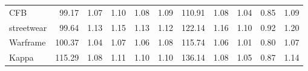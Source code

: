 \begin{tabular}{lrrrrrrrrrr}
CFB                 &          99.17 &                1.07 &                1.10 &                1.08 &                1.09 &                110.91 &                       1.08 &                       1.04 &                       0.85 &                       1.09 \\
streetwear          &          99.64 &                1.13 &                1.15 &                1.13 &                1.12 &                122.14 &                       1.16 &                       1.10 &                       0.92 &                       1.20 \\
Warframe            &         100.37 &                1.04 &                1.07 &                1.06 &                1.08 &                115.74 &                       1.06 &                       1.01 &                       0.80 &                       1.07 \\
Kappa               &         115.29 &                1.08 &                1.11 &                1.10 &                1.10 &                136.14 &                       1.08 &                       1.05 &                       0.87 &                       1.14 \\
\bottomrule
\end{tabular}
